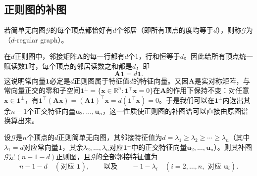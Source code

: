\subsection{正则图的补图}
\label{sec:adjacency-complement-spectrum}

\begin{definition}[正则图]
\label{def:regular-graph}
若简单无向图$\mathcal G$的每个顶点都恰好有$d$个邻居（即所有顶点的度均等于$d$），则称$\mathcal G$为（$d$-regular graph）。
\end{definition}

在$d$正则图中，邻接矩阵$\bm A$的每一行都有$d$个$1$，行和恒等于$d$。因此给所有顶点统一赋读数$1$时，每个顶点的邻居读数之和都是$d$，即
\[
\bm A\bm 1=d\bm 1.
\]
这说明常向量$\bm 1$必定是$d$正则图属于特征值$d$的特征向量。又因$\bm A$是实对称矩阵，与常向量正交的零和子空间$\bm 1^\perp=\{\bm x\in\mathbb R^n:\bm 1^\top\bm x=0\}$在$\bm A$的作用下保持不变：对任意$\bm x\in\bm 1^\perp$，有$\bm 1^\top(\bm A\bm x)=(\bm A\bm 1)^\top\bm x=d(\bm 1^\top\bm x)=0$。于是我们可以在$\bm 1^\perp$内选出其余$n-1$个正交特征向量$\bm u_2,\ldots,\bm u_n$，这一性质使正则图的补图谱可以直接由原图谱换算出来。

\begin{theorem}[正则图的补图谱]
\label{thm:adjacency-regular-complement}
设$\mathcal G$是$n$个顶点的$d$正则简单无向图，其邻接特征值为$d=\lambda_1\ge\lambda_2\ge\cdots\ge\lambda_n$（其中$\lambda_1=d$对应常向量$\bm 1$，其余$\lambda_2,\ldots,\lambda_n$对应$\bm 1^\perp$中的正交特征向量$\bm u_2,\ldots,\bm u_n$）。则其补图$\overline{\mathcal G}$是$(n-1-d)$正则图，且$\overline{\mathcal G}$的全部邻接特征值为
\[
n-1-d\quad(\text{对应 }\bm 1),
\qquad\text{以及}\qquad
-1-\lambda_i\quad(i=2,\ldots,n,\text{ 对应 }\bm u_i).
\]
\end{theorem}

